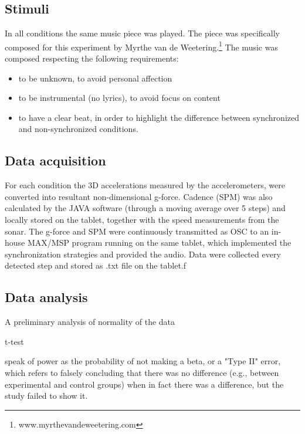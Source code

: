 \documentclass[10pt,letterpaper]{article}
\begin{document}
 

\subsection*{Stimuli}


In all conditions the same music piece was played. The piece was specifically composed for this experiment by Myrthe van de Weetering.\footnote{www.myrthevandeweetering.com}
The music was composed respecting the following requirements:
\begin{itemize}
\item to be unknown, to avoid personal affection
\item to be instrumental (no lyrics), to avoid focus on content
\item to have a clear beat, in order to highlight the difference between synchronized and non-synchronized conditions.
\end{itemize}


\subsection*{Data acquisition}
For each condition the 3D accelerations measured by the accelerometers, were converted into resultant non-dimensional g-force. Cadence (SPM) was also calculated by the JAVA software (through a moving average over 5 steps) and locally stored on the tablet, together with the speed measurements from the sonar. 
The g-force and SPM were continuously transmitted as OSC to an in-house MAX/MSP program running on the same tablet, which implemented the synchronization strategies and provided the audio. Data were collected every detected step and stored as .txt file on the tablet.f

\subsection*{Data analysis}

A preliminary analysis of normality of the data 

t-test 


speak of power as the probability of not making a beta, or a "Type II" error, which refers to falsely concluding that there was no difference (e.g., between experimental and control groups) when in fact there was a difference, but the study failed to show it.
\end{document}
